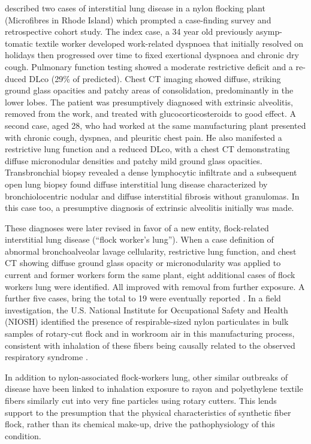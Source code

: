 \documentclass[a4paper,12pt]{article}
\begin{document}
\cite{Kern1998}  described two cases of interstitial lung disease in a nylon flocking plant (Microfibres in Rhode Island) which prompted a case-finding survey and retrospective cohort study. The index case, a 34 year old previously asymp- tomatic textile worker developed work-related dyspnoea that initially resolved on holidays then progressed over time to fixed exertional dyspnoea and chronic dry cough. Pulmonary function testing showed a moderate restrictive deficit and a re- duced DLco (29\% of predicted). Chest CT imaging showed diffuse, striking ground glass opacities and patchy areas of consolidation, predominantly in the lower lobes. The patient was presumptively diagnosed with extrinsic alveolitis, removed from the work, and treated with glucocorticosteroids to good effect. A second case, aged 28, who had worked at the same manufacturing plant presented with chronic cough, dyspnea, and pleuritic chest pain. He also manifested a restrictive lung function and a reduced DLco, with a chest CT demonstrating diffuse micronodular densities and patchy mild ground glass opacities. Transbronchial biopsy revealed a dense lymphocytic infiltrate and a subsequent open lung biopsy found diffuse interstitial lung disease characterized by bronchiolocentric nodular and diffuse interstitial fibrosis without granulomas. In this case too, a presumptive diagnosis of extrinsic alveolitis initially was made.

These diagnoses were later revised in favor of a new entity, flock-related interstitial lung disease (“flock worker’s lung”). When a case definition of abnormal bronchoalveolar lavage cellularity, restrictive lung function, and chest CT showing diffuse ground glass opacity or micronodularity was applied to current and former workers form the same plant, eight additional cases of flock workers lung were identified. All improved with removal from further exposure. A further five cases, bring the total to 19 were eventually reported \cite{Kern2000}. In a field investigation, the U.S. National Institute for Occupational Safety and Health (NIOSH) identified the presence of respirable-sized nylon particulates in bulk samples of rotary-cut flock and in workroom air in this manufacturing process, consistent with inhalation of these fibers being causally related to the observed respiratory syndrome \cite{Burkhart1999}.

In addition to nylon-associated flock-workers lung, other similar outbreaks of disease have been linked to inhalation exposure to rayon and polyethylene textile fibers similarly cut into very fine particles using rotary cutters. This lends support to the presumption that the physical characteristics of synthetic fiber flock, rather than its chemical make-up, drive the pathophysiology of this condition.
\end{document}
